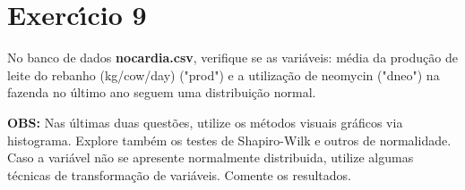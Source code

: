 \documentclass[a4paper,11pt,twoside,openright]{report}
\begin{document}
\section*{Exerc\'{\i}cio 9}
\hspace{0.5cm}No banco de dados \textbf{nocardia.csv}, verifique se as vari\'{a}veis: m\'{e}dia da produ\c{c}\~{a}o de leite do rebanho (kg/cow/day) ("prod")	e a utiliza\c{c}\~{a}o de neomycin ("dneo") na fazenda no \'{u}ltimo ano seguem uma distribui\c{c}\~{a}o normal.

\vspace{20mm} 
\small{\textbf{OBS:} Nas \'{u}ltimas duas quest\~{o}es, utilize os m\'{e}todos visuais gr\'{a}ficos via histograma. Explore tamb\'{e}m os testes de Shapiro-Wilk e outros de normalidade. 
Caso a vari\'{a}vel n\~{a}o se apresente normalmente distribuida, utilize algumas t\'{e}cnicas de transforma\c{c}\~{a}o de vari\'{a}veis. Comente os resultados.}
\end{document}
